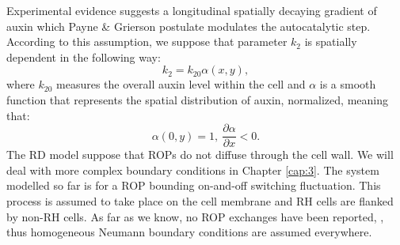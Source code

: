 Experimental evidence suggests a longitudinal spatially decaying gradient of auxin which Payne \& Grierson postulate modulates the autocatalytic step. According to this assumption, we suppose that parameter $k_2$ is spatially dependent in the following way:
\begin{equation}
    k_2 = k_{20} \alpha \left(x, y\right),
\end{equation}
where $k_{20}$ measures the overall auxin level within the cell and $\alpha$ is a smooth function that represents the spatial distribution of auxin, normalized, meaning that:
\begin{equation}\label{eq:jones auxina}
    \alpha(0,y) = 1, \ \frac{\partial \alpha}{\partial x} < 0.
\end{equation}
%
The RD model suppose that ROPs do not diffuse through the cell wall. We will deal with more complex boundary conditions in Chapter \ref{cap:3}. The system modelled so far is for a ROP bounding on-and-off switching fluctuation. This process is assumed to take place on the cell membrane and RH cells are flanked by non-RH cells. As far as we know, no ROP exchanges have been reported,  \cite{intra1_R:Arabook}, thus homogeneous Neumann boundary conditions are assumed everywhere.

